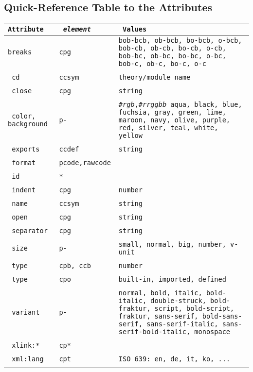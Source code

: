 \begin{appendix}
\chapter{Quick-Reference Table to the {\codeml} Attributes}\label{sec:att-table}
\def\atabelt#1#2#3#4{{#1}&{#2}&{#3}\\\hline&\multicolumn{2}{|p{9cm}|}{#4}\\\hline\hline}
{\footnotesize\begin{longtable}{|>{\tt}p{2.5cm}|>{\tt}p{4cm}|>{\tt}p{5cm}|}\hline
{\rm Attribute} & {\em element} & Values \\\hline\hline
\atabelt{breaks}{cpg}{bob-bcb, ob-bcb, bo-bcb, o-bcb, bob-cb, ob-cb, bo-cb, o-cb,
  bob-bc, ob-bc, bo-bc, o-bc, bob-c, ob-c, bo-c, o-c}
  {SAY SOMETHING HERE, also about prioritized breaks}
\atabelt{cd}{ccsym}{{\rm theory/module name}}{The name of a theory or a module
  that exports this symbol}
\atabelt{close}{cpg}{string}{The closing bracket of group of {\codeml} constructs
  this is inserted into the presentation in place of the opneing tag of its
  {\element{cpg}} element}
\atabelt{color, background}{p-{\codeml}}{{\#{\sl rgb}},{\#{\sl rrggbb}} aqua,
  black, blue, fuchsia, gray, green, lime, maroon, navy, olive, purple, red,
  silver, teal, white, yellow}
  {The color of the text representation or the background of a
   presentation-{\codeml} element}
\atabelt{exports}{ccdef}{string}{the name of a symbol defined by the {\element{ccdef}}
  element}
\atabelt{format}{pcode,rawcode}{}{The format, e.g. the programming language}
\atabelt{id}{*}{}{a string that identifies the element}
\atabelt{indent}{cpg}{number}{a factor for the default indentation
  increment used by the presentation agent}
\atabelt{name}{ccsym}{string}{The name the symbol}
\atabelt{open}{cpg}{string}{The opening bracket of group of {\codeml} constructs;
  this is inserted into the presentation in place of the opneing tag of its
  {\element{cpg}} element}
\atabelt{separator}{cpg}{string}{The separator bracket of group of {\codeml} constructs
  this is inserted into the presentation between the children of its
  {\element{cpg}} element}
\atabelt{size}{p-{\codeml}}{small, normal, big, {\rm number}, {\rm v-unit}}
  {The font size of the text representation of a presentation-{\codeml} element}
\atabelt{type}{cpb, ccb}{number}{the type of the basic object}
\atabelt{type}{cpo}{built-in, imported, defined}{the type of the basic object}
\atabelt{variant}{p-{\codeml}}{normal, bold, italic, bold-italic, double-struck,
  bold-fraktur, script, bold-script, fraktur, sans-serif, bold-sans-serif,
  sans-serif-italic, sans-serif-bold-italic, monospace}
  {The font variant of the text of a presentation-{\codeml} element}
\atabelt{xlink:*}{cp*}{} {a crossreference to a semantically equivalent content
  element; the value of {\attribute{xlink:xref}{presentation-CodeML}} (an URIRef)
  specifies the element, the value of
  {\attribute{xlink:type}{presentation-CodeML}} must be {\ttin{simple}} (it is
  fixed in the DTD), and the {\attribute{xlink:role}{presentation-CodeML}} is a
  fixed URL to a document that explains this link type.}
\atabelt{xml:lang}{cpt}{ISO 639: en, de, it, ko, ...}{the language the text is
  written in}
\end{longtable}}


\end{appendix}
